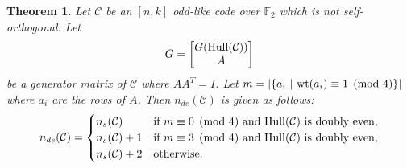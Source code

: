 \documentclass{article}
\newtheorem{theorem}{Theorem}[section]
\theoremstyle{definition}
\theoremstyle{remark}
\begin{document}
\begin{theorem}\label{doublyevenod}
Let $\mathcal{C}$ be an $[n, k]$ odd-like code over $\mathbb{F}_2$ which is not self-orthogonal. Let
    \[
    G=\begin{bmatrix}G({\rm{Hull}}(\mathcal{C}))\\A \end{bmatrix}
    \]
    be a generator matrix of $\mathcal{C}$ where $AA^T=I$. Let $m=|\{a_i~|~{\rm{wt}}(a_i)\equiv1\pmod 4\}|$ where $a_i$ are the rows of $A$. Then $n_{de}(\mathcal{C})$ is given as follows:
    \[
    n_{de}(\mathcal{C})=\begin{cases}
        n_s(\mathcal{C}) & \mbox{if}~m\equiv 0\pmod 4~\mbox{and}~{\rm Hull}(\mathcal{C})~\mbox{is doubly even},\\
        n_s(\mathcal{C})+1 & \mbox{if}~m\equiv 3\pmod 4~\mbox{and}~{\rm Hull}(\mathcal{C})~\mbox{is doubly even},\\
        n_s(\mathcal{C})+2 & \mbox{otherwise}.
    \end{cases}
    \]
\end{theorem}
\end{document}
